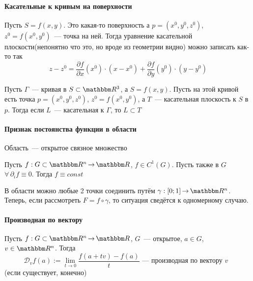\documentclass[12pt]{../../notes}
\begin{document}
\paragraph{Касательные к кривым на поверхности}

\begin{stat}\label{stat:tanplane}
  Пусть $S = f(x,y)$. Это какая-то поверхность а $p = (x^0, y^0, z^0)$, $z^0 = f(x^0, y^0)$~--- точка на
  ней. Тогда уравнение касательной плоскости(непонятно что это, но вроде из геометрии видно) можно записать как-то так
  \[
    z - z^0 = \frac{\partial f}{\partial x}(x^0)\cdot(x-x^0) + \frac{\partial f}{\partial y}(y^0)\cdot(y-y^0) 
  \]
\end{stat}


\begin{stat}\label{stat:curvetanRn}
  Пусть $\Gamma$~--- кривая в $S\subset\R^3$, а $S = f(x,y)$. Пусть на этой кривой есть точка 
  $p = (x^0, y^0, z^0)$, $z^0 = f(x^0, y^0)$, а $T$~--- касательная плоскость к $S$ в $p$.
  Тогда если $L$~---  касательная к $\Gamma$, то $L \subset T$
\end{stat}


\paragraph{Признак постоянства функции в области}
\begin{defn}\label{defn:spaceRn}
  Область~--- открытое связное множество
\end{defn}

\begin{thrm}\label{thrm:signconstRn}
  Пусть $f:G\subset\R^n \to \R$, $f\in C^1(G)$. Пусть также в $G$ $\forall\, \partial_i f \equiv 0$.
  Тогда $f \equiv const$
\end{thrm}
\begin{ittproof}
  В области можно любые 2 точки соединить путём $\gamma : [0;1] \to \R^n$. Теперь, если рассмотреть $F = f \circ \gamma$, то
  ситуация сведётся к одномерному случаю.
\end{ittproof}

\paragraph{Производная по вектору}
\begin{defn}\label{defn:vecderivRn}
  Пусть $f:G\subset\R^n \to \R$, $G$~--- открытое, $a\in G$, $v \in \R^n$. Тогда
  \[
    \mathcal{D}_v f(a) := \lim_{t\to 0} \frac{f(a+tv)-f(a)}{t}\text{~--- производная по вектору $v$ }
  \]
  (если существует, конечно)
\end{defn}
\end{document}
